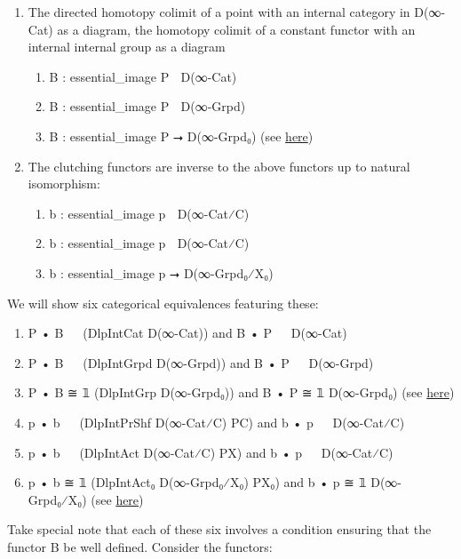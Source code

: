 \documentclass{book}
\theoremstyle{definition}
\begin{document}
\begin{enumerate}
\item The directed homotopy colimit of a point with an internal category in D(∞-Cat) as a diagram, the homotopy colimit of a constant functor with an internal internal group as a diagram
\begin{enumerate}
\item B⃗ : essential\_image P⃗ ⭢ D(∞-Cat)
\item B⃡ : essential\_image P⃡ ⭢ D(∞-Grpd)
\item B : essential\_image P ⭢ D(∞-Grpd₀) (see \href{https://mathoverflow.net/questions/128883/why-omega-x-and-bg-are-adjoint-functors}{here})
\end{enumerate}
\item The clutching functors are inverse to the above functors up to natural isomorphism:
\begin{enumerate}
\item b⃗ : essential\_image p⃗ ⭢ D(∞-Cat⁄C)
\item b⃡ : essential\_image p⃡ ⭢ D(∞-Cat⁄C)
\item b : essential\_image p ⭢ D(∞-Grpd₀⁄X₀) 
\end{enumerate}
\end{enumerate}

We will show six categorical equivalences featuring these:

\begin{enumerate}
\item P⃗ • B⃗ ≅ 𝟙 (DlpIntCat D(∞-Cat)) and B⃗ • P⃗ ≅ 𝟙 D(∞-Cat)
\item P⃡ • B⃡ ≅ 𝟙 (DlpIntGrpd D(∞-Grpd)) and B⃡ • P⃡ ≅ 𝟙 D(∞-Grpd)
\item P • B ≅ 𝟙 (DlpIntGrp D(∞-Grpd₀)) and B • P ≅ 𝟙 D(∞-Grpd₀) (see \href{https://mathoverflow.net/questions/128883/why-omega-x-and-bg-are-adjoint-functors}{here})
\item p⃗ • b⃗ ≅ 𝟙 (DlpIntPrShf D(∞-Cat⁄C) P⃗C) and b⃗ • p⃗ ≅ 𝟙 D(∞-Cat⁄C)
\item p⃡ • b⃡ ≅ 𝟙 (DlpIntAct D(∞-Cat⁄C) P⃡X) and b⃡ • p⃡ ≅ 𝟙 D(∞-Cat⁄C) 
\item p • b ≅ 𝟙 (DlpIntAct₀ D(∞-Grpd₀⁄X₀) PX₀) and b • p ≅ 𝟙 D(∞-Grpd₀⁄X₀) (see \href{https://en.wikipedia.org/wiki/Principal_bundle}{here})
\end{enumerate}

Take special note that each of these six involves a condition ensuring that the functor B⃗ be well defined. Consider the functors:
\end{document}
